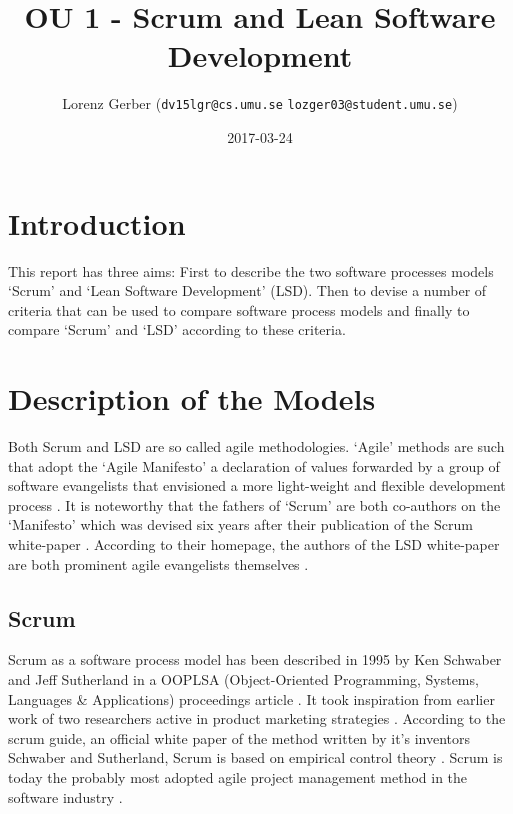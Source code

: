 \documentclass[a4paper,11pt,twoside]{article}
\title{OU 1 - Scrum and Lean Software Development}
\author{Lorenz Gerber ({\tt{dv15lgr@cs.umu.se}} {\tt{lozger03@student.umu.se}})}
\date{2017-03-24}
\begin{document}
\lstset{language=C}
\maketitle
\thispagestyle{empty}
\newpage

\clearpage
{}

\section{Introduction}
This report has three aims: First to describe the two software processes models `Scrum' and `Lean Software Development' (LSD). Then to devise a number of criteria that can be used to compare software process models and finally to compare `Scrum' and `LSD' according to these criteria.

\section{Description of the Models}
Both Scrum and LSD are so called agile methodologies. `Agile' methods are such that adopt the `Agile Manifesto' a declaration of values forwarded by a group of software evangelists that envisioned a more light-weight and flexible development process \cite{manifesto}. It is noteworthy that the fathers of `Scrum' are both co-authors on the `Manifesto' which was devised six years after their publication of the Scrum white-paper \cite{oopsla1995}. According to their homepage, the authors of the LSD white-paper are both prominent agile evangelists themselves \cite{poppendieckweb}. 

\subsection{Scrum}
Scrum as a software process model has been described in 1995 by Ken Schwaber and Jeff Sutherland in a OOPLSA (Object-Oriented Programming, Systems, Languages \& Applications) proceedings article \cite{oopsla1995}. It took inspiration from earlier work of two researchers active in product marketing strategies \cite{takeuchi1986}. According to the scrum guide, an official white paper of the method written by it's inventors Schwaber and Sutherland, Scrum is based on empirical control theory \cite{scrumguide}. Scrum is today the probably most adopted agile project management method in the software industry \cite[p. 86]{sommerville2016}.
\end{document}
